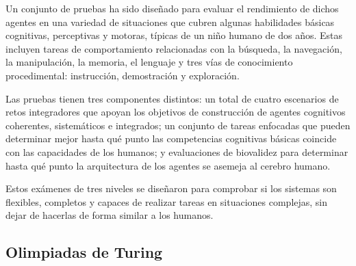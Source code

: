 Un conjunto de pruebas ha sido diseñado para evaluar el rendimiento de dichos agentes en una variedad de situaciones que cubren algunas habilidades básicas cognitivas, perceptivas y motoras, típicas de un niño humano de dos años. Estas incluyen tareas de comportamiento relacionadas con la búsqueda, la navegación, la manipulación, la memoria, el lenguaje y tres vías de conocimiento procedimental: instrucción, demostración y exploración.

Las pruebas tienen tres componentes distintos: un total de cuatro escenarios de retos integradores que apoyan los objetivos de construcción de agentes cognitivos coherentes, sistemáticos e integrados; un conjunto de tareas enfocadas que pueden determinar mejor hasta qué punto las competencias cognitivas básicas coincide con las capacidades de los humanos; y evaluaciones de biovalidez para determinar hasta qué punto la arquitectura de los agentes se asemeja al cerebro humano.
 
Estos exámenes de tres niveles se diseñaron para comprobar si los sistemas son flexibles, completos y capaces de realizar tareas en situaciones complejas, sin dejar de hacerlas de forma similar a los humanos.

\subsection{Olimpiadas de Turing}


